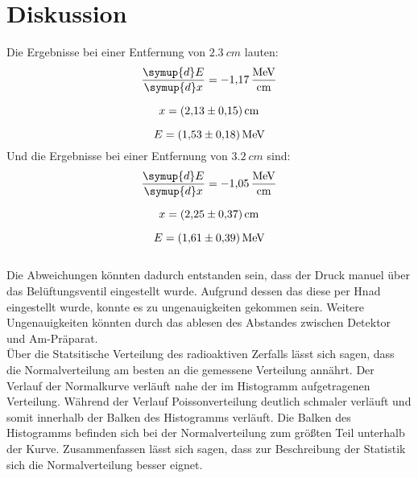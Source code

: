 \section{Diskussion}
\label{sec:Diskussion}
Die Ergebnisse bei einer Entfernung von $\qty{2.3}{cm}$ lauten:
\begin{equation*}
    \frac{\symup{d}E}{\symup{d}x}=\qty{-1.17}{\mega\electronvolt\per\centi\meter}
\end{equation*}

\begin{equation*}
   x = \qty{2.13 \pm 0.15}{cm}
\end{equation*}
   
\begin{equation*}
    E = \qty{1.53 \pm 0.18}{MeV}
\end{equation*}
Und die Ergebnisse bei einer Entfernung von $\qty{3.2}{cm}$ sind:
\begin{equation*}
    \frac{\symup{d}E}{\symup{d}x}=\qty{-1.05}{\mega\electronvolt\per\centi\meter}
\end{equation*}

\begin{equation*}
   x = \qty{2.25 \pm 0.37}{cm}
\end{equation*}
   
\begin{equation*}
    E = \qty{1.61 \pm 0.39}{MeV}
\end{equation*}
\\


\noindent Die Abweichungen könnten dadurch entstanden sein, dass 
der Druck manuel über das Belüftungsventil eingestellt wurde.
Aufgrund dessen das diese per Hnad eingestellt wurde, konnte es zu ungenauigkeiten gekommen sein. 
Weitere Ungenauigkeiten könnten durch das ablesen des Abstandes zwischen Detektor und Am-Präparat.\\


\noindent Über die Statsitische Verteilung des radioaktiven Zerfalls lässt sich sagen, dass 
die Normalverteilung am besten an die gemessene Verteilung annährt.
Der Verlauf der Normalkurve verläuft nahe der im Histogramm aufgetragenen Verteilung.
Während der Verlauf Poissonverteilung deutlich schmaler verläuft und somit innerhalb der Balken des Histogramms verläuft.
Die Balken des Histogramms befinden sich bei der Normalverteilung zum größten Teil unterhalb der Kurve.
Zusammenfassen lässt sich sagen, dass zur Beschreibung der Statistik sich die Normalverteilung besser eignet.
